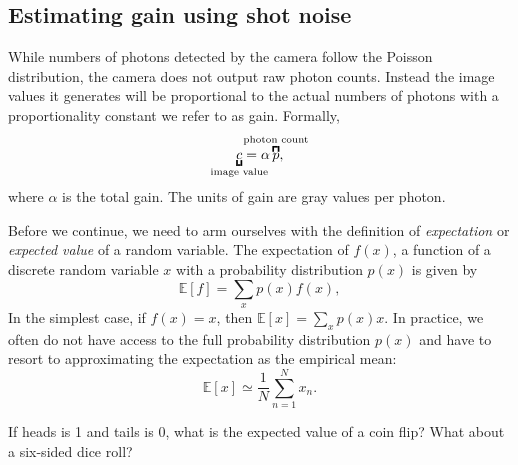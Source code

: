 \documentclass[a4paper]{report}
\newcommand{\nexercise}[0]{\arabic{exercises}\addtocounter{exercises}{1}}
\begin{document}
\subsection{Estimating gain using shot noise}
While numbers of photons detected by the camera follow the Poisson distribution, the camera does not output raw photon counts.
Instead the image values it generates will be proportional to the actual numbers of photons with a proportionality constant we refer to as gain.
Formally,
\begin{equation}
	\underbracket{c}_{\mathclap{\text{image value}}} = \alpha \overbracket{p}^{\mathclap{\text{photon count}}},
\end{equation} 
where $\alpha$ is the total gain.
The units of gain are gray values per photon. 

Before we continue, we need to arm ourselves with the definition of \textit{expectation} or \textit{expected value} of a random variable. 
The expectation of $f(x)$, a function of a discrete random variable $x$ with a probability distribution $p(x)$ is given by
\begin{equation}
\mathbb {E} [f] = \sum _{x} p(x) f(x),
\end{equation}
In the simplest case, if $f(x) = x$, then $\mathbb {E} [x] = \sum _{x} p(x) x$. 
In practice, we often do not have access to the full probability distribution $p(x)$ and have to resort to approximating the expectation as the empirical mean:
\begin{equation}
\mathbb { E } [ x ] \simeq \frac { 1 } { N } \sum _ { n = 1 } ^ { N } x _{n}.
\end{equation}

\begin{exercisebox}[frametitle={Exercise \nexercise: Expectation example}]
If heads is 1 and tails is 0, what is the expected value of a coin flip? What about a six-sided dice roll? 
\end{exercisebox}
\end{document}

